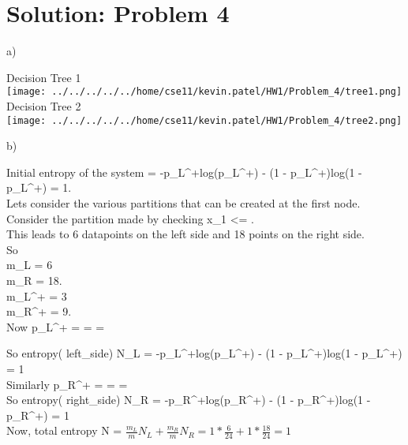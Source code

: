 \documentclass[twoside,10pt,a4paper]{article}
\theoremstyle{definition}
\theoremstyle{definition}
\theoremstyle{remark}
\renewcommand{\>}{{\rightarrow}}
\newcommand{\1}{{\mathbf 1}}
\newcommand{\0}{{\mathbf 0}}
\begin{document}
\section{Solution: Problem 4}
a) 
\begin{center}
Decision Tree 1\\
\texttt{[image: ../../../../../home/cse11/kevin.patel/HW1/Problem\_4/tree1.png]}
\linebreak
Decision Tree 2\\
\hspace{10pt}\texttt{[image: ../../../../../home/cse11/kevin.patel/HW1/Problem\_4/tree2.png]}
\end{center}
\pagebreak
b)

Initial entropy of the system = -p_L^+log(p_L^+) - (1 - p_L^+)log(1 - p_L^+) = 1.\\

Lets consider the various partitions that can be created at the first node. \\

Consider the partition made by checking x_1 <= .\\

This leads to 6 datapoints on the left side and 18 points on the right side.\\

So \\
m_L = 6 \\
m_R = 18.\\
m_L^+ = 3 \\
m_R^+ = 9.\\

Now
p_L^+ =  =  = 

So
entropy( left\_side) N_L = -p_L^+log(p_L^+) - (1 - p_L^+)log(1 - p_L^+) = 1\\

Similarly
p_R^+ =  =  =  \\

So
entropy( right\_side) N_R = -p_R^+log(p_R^+) - (1 - p_R^+)log(1 - p_R^+) = 1\\

Now, total entropy N = $\frac{ m_L }{ m } N_L + \frac{m_R}{m} N_R = 1 * \frac{6}{24} + 1 * \frac{18}{24} = 1$\\ ~\\
\end{document}

